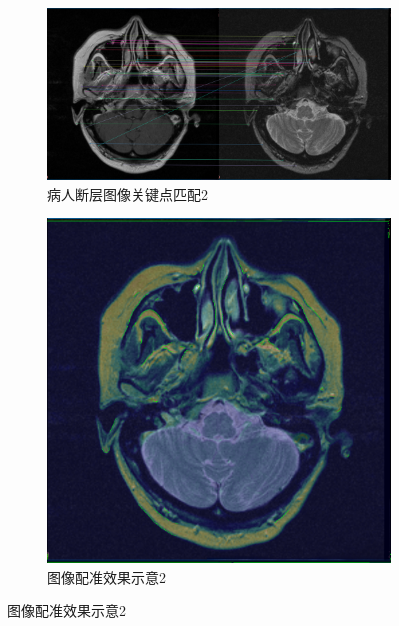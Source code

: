 \documentclass[a4paper, utf8]{ctexart}
\begin{document}
\begin{figure}[htbp]
		\begin{subfigure}{.6\textwidth}
			\centering
			\includegraphics[height=.13\textheight]{./figure/match_opencv_2.png}
			\caption{病人断层图像关键点匹配2}
		\end{subfigure}
		\begin{subfigure}{.3\textwidth}
			\centering
			\includegraphics[height=.13\textheight]{./figure/compare_opencv_2.png}
			\caption{图像配准效果示意2}
		\end{subfigure}
		

\end{figure}
\end{document}
